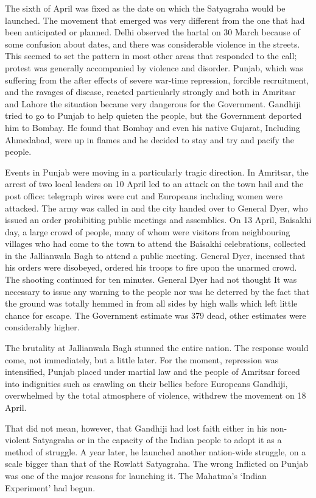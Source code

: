 \begin{multicols}{2}
The sixth of April was fixed as the date on which the Satyagraha would be launched. The movement that emerged was very different from the one that had been anticipated or planned. Delhi observed the hartal on 30 March because of some confusion about dates, and there was considerable violence in the streets. This seemed to set the pattern in most other areas that responded to the call; protest was generally accompanied by violence and disorder. Punjab, which was suffering from the after effects of severe war-time repression, forcible recruitment, and the ravages of disease, reacted particularly strongly and both in Amritsar and Lahore the situation became very dangerous for the Government. Gandhiji tried to go to Punjab to help quieten the people, but the Government deported him to Bombay. He found that Bombay and even his native Gujarat, Including Ahmedabad, were up in flames and he decided to stay and try and pacify the people.

Events in Punjab were moving in a particularly tragic direction. In Amritsar, the arrest of two local leaders on 10 April led to an attack on the town hail and the post office: telegraph wires were cut and Europeans including women were attacked. The army was called in and the city handed over to General Dyer, who issued an order prohibiting public meetings and assemblies. On 13 April, Baisakhi day, a large crowd of people, many of whom were visitors from neighbouring villages who had come to the town to attend the Baisakhi celebrations, collected in the Jallianwala Bagh to attend a public meeting. General Dyer, incensed that his orders were disobeyed, ordered his troops to fire upon the unarmed crowd. The shooting continued for ten minutes. General Dyer had not thought It was necessary to issue any warning to the people nor was he deterred by the fact that the ground was totally hemmed in from all sides by high walls which left little chance for escape. The Government estimate was 379 dead, other estimates were considerably higher.

The brutality at Jallianwala Bagh stunned the entire nation. The response would come, not immediately, but a little later. For the moment, repression was intensified, Punjab placed under martial law and the people of Amritsar forced into indignities such as crawling on their bellies before Europeans Gandhiji, overwhelmed by the total atmosphere of violence, withdrew the movement on 18 April.

That did not mean, however, that Gandhiji had lost faith either in his non-violent Satyagraha or in the capacity of the Indian people to adopt it as a method of struggle. A year later, he launched another nation-wide struggle, on a scale bigger than that of the Rowlatt Satyagraha. The wrong Inflicted on Punjab was one of the major reasons for launching it. The Mahatma's `Indian Experiment' had begun.
\end{multicols}
